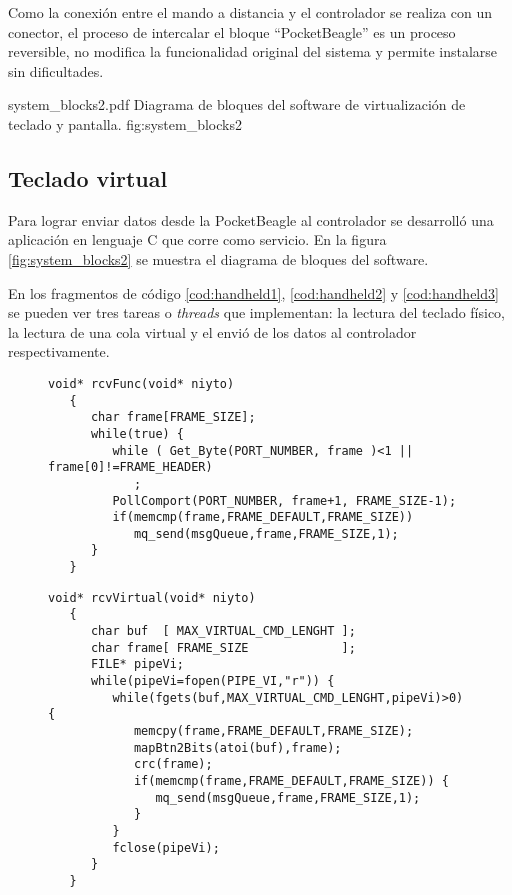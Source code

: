          Como la conexión entre el mando a distancia y el controlador se realiza con un conector, el proceso de intercalar el bloque ``PocketBeagle'' es un proceso reversible, no modifica la funcionalidad original del sistema y permite instalarse sin dificultades.\par


         {system_blocks2.pdf}
         {Diagrama de bloques del software de virtualización de teclado y pantalla.}
         {fig:system_blocks2}

\subsection{Teclado virtual}
\label{subsection:teclado_virtual}

      Para lograr enviar datos desde la PocketBeagle al controlador se desarrolló una aplicación en lenguaje C que corre como servicio. En la figura \ref{fig:system_blocks2} se muestra el diagrama de bloques del software.\par
      En los fragmentos de código \ref{cod:handheld1}, \ref{cod:handheld2} y \ref{cod:handheld3} se pueden ver tres tareas o \textit{threads} que implementan: la lectura del teclado físico, la lectura de una cola virtual y el envió de los datos al controlador respectivamente.\par

\begin{figure}[!h]
   \begin{lstlisting}[caption={Tarea encargada de procesar los datos del teclado físico y reenviarlos a la cola de multiplexado.},label={cod:handheld1}]
   void* rcvFunc(void* niyto)
   {
      char frame[FRAME_SIZE];
      while(true) {
         while ( Get_Byte(PORT_NUMBER, frame )<1 || frame[0]!=FRAME_HEADER)
            ;
         PollComport(PORT_NUMBER, frame+1, FRAME_SIZE-1);
         if(memcmp(frame,FRAME_DEFAULT,FRAME_SIZE))
            mq_send(msgQueue,frame,FRAME_SIZE,1);
      }
   }
   \end{lstlisting}
\end{figure}

\begin{figure}[!h]
   \begin{lstlisting}[caption={Tarea que recibe datos del teclado virtual y los reenvía a la cola de multiplexado.},label={cod:handheld2}]
   void* rcvVirtual(void* niyto)
   {
      char buf  [ MAX_VIRTUAL_CMD_LENGHT ];
      char frame[ FRAME_SIZE             ];
      FILE* pipeVi;
      while(pipeVi=fopen(PIPE_VI,"r")) {
         while(fgets(buf,MAX_VIRTUAL_CMD_LENGHT,pipeVi)>0) {
            memcpy(frame,FRAME_DEFAULT,FRAME_SIZE);
            mapBtn2Bits(atoi(buf),frame);
            crc(frame);
            if(memcmp(frame,FRAME_DEFAULT,FRAME_SIZE)) {
               mq_send(msgQueue,frame,FRAME_SIZE,1);
            }
         }
         fclose(pipeVi);
      }
   }
   \end{lstlisting}
\end{figure}

